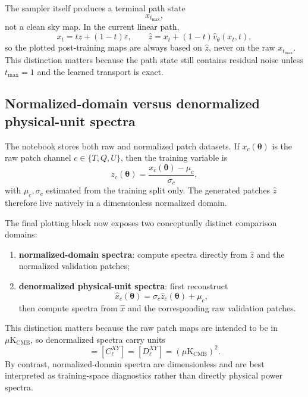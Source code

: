 \documentclass[11pt]{article}
\newcommand{\e}{\varepsilon}
\begin{document}
The sampler itself produces a terminal path state
\begin{equation}
  x_{t_{\max}},
\end{equation}
not a clean sky map. In the current linear path,
\begin{equation}
  x_t = t z + (1-t)\e,
  \qquad
  \hat z = x_t + (1-t)\hat v_\theta(x_t,t),
\end{equation}
so the plotted post-training maps are always based on \(\hat z\), never on the raw \(x_{t_{\max}}\). This distinction matters because the path state still contains residual noise unless \(t_{\max}=1\) and the learned transport is exact.

\subsection{Normalized-domain versus denormalized physical-unit spectra}

The notebook stores both raw and normalized patch datasets. If \(x_c(\bm{\theta})\) is the raw patch channel \(c\in\{T,Q,U\}\), then the training variable is
\begin{equation}
  z_c(\bm{\theta})
  =
  \frac{x_c(\bm{\theta})-\mu_c}{\sigma_c},
\end{equation}
with \(\mu_c,\sigma_c\) estimated from the training split only. The generated patches \(\hat z\) therefore live natively in a dimensionless normalized domain.

The final plotting block now exposes two conceptually distinct comparison domains:
\begin{enumerate}[leftmargin=1.5em]
  \item \textbf{normalized-domain spectra}: compute spectra directly from \(\hat z\) and the normalized validation patches;
  \item \textbf{denormalized physical-unit spectra}: first reconstruct
  \begin{equation}
    \hat x_c(\bm{\theta})
    =
    \sigma_c \hat z_c(\bm{\theta}) + \mu_c,
  \end{equation}
  then compute spectra from \(\hat x\) and the corresponding raw validation patches.
\end{enumerate}

This distinction matters because the raw patch maps are intended to be in \(\mu\mathrm{K}_{\mathrm{CMB}}\), so denormalized spectra carry units
\begin{equation}
  [P^{XY}] = [C_\ell^{XY}] = [D_\ell^{XY}] = (\mu\mathrm{K}_{\mathrm{CMB}})^2.
\end{equation}
By contrast, normalized-domain spectra are dimensionless and are best interpreted as training-space diagnostics rather than directly physical power spectra.
\end{document}
